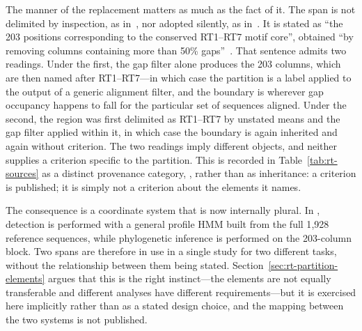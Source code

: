 The manner of the replacement matters as much as the fact of it. The span is
not delimited by inspection, as in~\cite{xiong1990}, nor adopted silently, as
in~\cite{toro2014,toro2019,mestre2020}. It is stated as ``the 203 positions
corresponding to the conserved RT1--RT7 motif core'', obtained ``by removing
columns containing more than 50\% gaps''~\cite{toro2026}. That sentence admits
two readings. Under the first, the gap filter alone produces the 203 columns,
which are then named after RT1--RT7---in which case the partition is a label
applied to the output of a generic alignment filter, and the boundary is
wherever gap occupancy happens to fall for the particular set of sequences
aligned. Under the second, the region was first delimited as RT1--RT7 by
unstated means and the gap filter applied within it, in which case the
boundary is again inherited and again without criterion. The two readings
imply different objects, and neither supplies a criterion specific to the
partition. This is recorded in Table~\ref{tab:rt-sources} as a distinct
provenance category, \operational, rather than as inheritance: a criterion is
published; it is simply not a criterion about the elements it names.

The consequence is a coordinate system that is now internally plural. In
\cite{toro2026}, detection is performed with a general profile HMM built from
the full 1{,}928 reference sequences, while phylogenetic inference is
performed on the 203-column block. Two spans are therefore in use in a single
study for two different tasks, without the relationship between them being
stated. Section~\ref{sec:rt-partition-elements} argues that this is the right
instinct---the elements are not equally transferable and different analyses
have different requirements---but it is exercised here implicitly rather than
as a stated design choice, and the mapping between the two systems is not
published.



